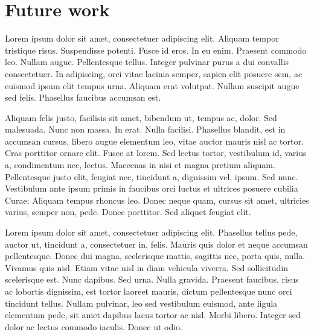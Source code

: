 \section{Future work}

Lorem ipsum dolor sit amet, consectetuer adipiscing elit. Aliquam
tempor tristique risus. Suspendisse potenti. Fusce id eros. In eu
enim. Praesent commodo leo. Nullam augue. Pellentesque tellus. Integer
pulvinar purus a dui convallis consectetuer. In adipiscing, orci vitae
lacinia semper, sapien elit posuere sem, ac euismod ipsum elit tempus
urna. Aliquam erat volutpat. Nullam suscipit augue sed
felis. Phasellus faucibus accumsan est. 

Aliquam felis justo, facilisis sit amet, bibendum ut, tempus ac,
dolor. Sed malesuada. Nunc non massa. In erat. Nulla
facilisi. Phasellus blandit, est in accumsan cursus, libero augue
elementum leo, vitae auctor mauris nisl ac tortor. Cras porttitor
ornare elit. Fusce at lorem. Sed lectus tortor, vestibulum id, varius
a, condimentum nec, lectus. Maecenas in nisi et magna pretium
aliquam. Pellentesque justo elit, feugiat nec, tincidunt a, dignissim
vel, ipsum. Sed nunc. Vestibulum ante ipsum primis in faucibus orci
luctus et ultrices posuere cubilia Curae; Aliquam tempus rhoncus
leo. Donec neque quam, cursus sit amet, ultricies varius, semper non,
pede. Donec porttitor. Sed aliquet feugiat elit.  

\vspace*{12mm}

Lorem ipsum dolor sit amet, consectetuer adipiscing elit. Phasellus
tellus pede, auctor ut, tincidunt a, consectetuer in, felis. Mauris
quis dolor et neque accumsan pellentesque. Donec dui magna,
scelerisque mattis, sagittis nec, porta quis, nulla. Vivamus quis
nisl. Etiam vitae nisl in diam vehicula viverra. Sed sollicitudin
scelerisque est. Nunc dapibus. Sed urna. Nulla gravida. Praesent
faucibus, risus ac lobortis dignissim, est tortor laoreet mauris,
dictum pellentesque nunc orci tincidunt tellus. Nullam pulvinar, leo
sed vestibulum euismod, ante ligula elementum pede, sit amet dapibus
lacus tortor ac nisl. Morbi libero. Integer sed dolor ac lectus
commodo iaculis. Donec ut odio.
